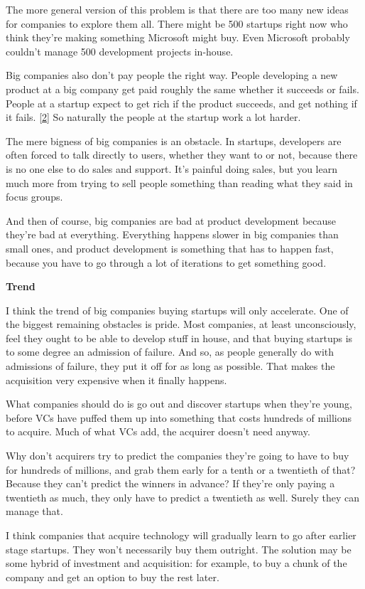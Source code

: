 The more general version of this problem is that there are too many new
ideas for companies to explore them all. There might be 500 startups
right now who think they're making something Microsoft might buy. Even
Microsoft probably couldn't manage 500 development projects in-house.

Big companies also don't pay people the right way. People developing a
new product at a big company get paid roughly the same whether it
succeeds or fails. People at a startup expect to get rich if the product
succeeds, and get nothing if it fails. {[}\hyperref[f2n]{2}{]} So
naturally the people at the startup work a lot harder.

The mere bigness of big companies is an obstacle. In startups,
developers are often forced to talk directly to users, whether they want
to or not, because there is no one else to do sales and support. It's
painful doing sales, but you learn much more from trying to sell people
something than reading what they said in focus groups.

And then of course, big companies are bad at product development because
they're bad at everything. Everything happens slower in big companies
than small ones, and product development is something that has to happen
fast, because you have to go through a lot of iterations to get
something good.

\textbf{Trend}

I think the trend of big companies buying startups will only accelerate.
One of the biggest remaining obstacles is pride. Most companies, at
least unconsciously, feel they ought to be able to develop stuff in
house, and that buying startups is to some degree an admission of
failure. And so, as people generally do with admissions of failure, they
put it off for as long as possible. That makes the acquisition very
expensive when it finally happens.

What companies should do is go out and discover startups when they're
young, before VCs have puffed them up into something that costs hundreds
of millions to acquire. Much of what VCs add, the acquirer doesn't need
anyway.

Why don't acquirers try to predict the companies they're going to have
to buy for hundreds of millions, and grab them early for a tenth or a
twentieth of that? Because they can't predict the winners in advance? If
they're only paying a twentieth as much, they only have to predict a
twentieth as well. Surely they can manage that.

I think companies that acquire technology will gradually learn to go
after earlier stage startups. They won't necessarily buy them outright.
The solution may be some hybrid of investment and acquisition: for
example, to buy a chunk of the company and get an option to buy the rest
later.

